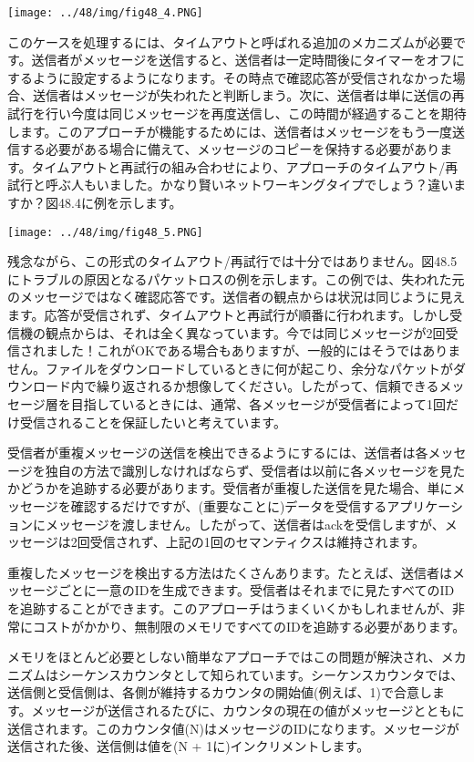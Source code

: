 \texttt{[image: ../48/img/fig48\_4.PNG]}

このケースを処理するには、タイムアウトと呼ばれる追加のメカニズムが必要です。送信者がメッセージを送信すると、送信者は一定時間後にタイマーをオフにするように設定するようになります。その時点で確認応答が受信されなかった場合、送信者はメッセージが失われたと判断しまう。次に、送信者は単に送信の再試行を行い今度は同じメッセージを再度送信し、この時間が経過することを期待します。このアプローチが機能するためには、送信者はメッセージをもう一度送信する必要がある場合に備えて、メッセージのコピーを保持する必要があります。タイムアウトと再試行の組み合わせにより、アプローチのタイムアウト/再試行と呼ぶ人もいました。かなり賢いネットワーキングタイプでしょう？違いますか？図48.4に例を示します。

\texttt{[image: ../48/img/fig48\_5.PNG]}

残念ながら、この形式のタイムアウト/再試行では十分ではありません。図48.5にトラブルの原因となるパケットロスの例を示します。この例では、失われた元のメッセージではなく確認応答です。送信者の観点からは状況は同じように見えます。応答が受信されず、タイムアウトと再試行が順番に行われます。しかし受信機の観点からは、それは全く異なっています。今では同じメッセージが2回受信されました！これがOKである場合もありますが、一般的にはそうではありません。ファイルをダウンロードしているときに何が起こり、余分なパケットがダウンロード内で繰り返されるか想像してください。したがって、信頼できるメッセージ層を目指しているときには、通常、各メッセージが受信者によって1回だけ受信されることを保証したいと考えています。

受信者が重複メッセージの送信を検出できるようにするには、送信者は各メッセージを独自の方法で識別しなければならず、受信者は以前に各メッセージを見たかどうかを追跡する必要があります。受信者が重複した送信を見た場合、単にメッセージを確認するだけですが、(重要なことに)データを受信するアプリケーションにメッセージを渡しません。したがって、送信者はackを受信しますが、メッセージは2回受信されず、上記の1回のセマンティクスは維持されます。

重複したメッセージを検出する方法はたくさんあります。たとえば、送信者はメッセージごとに一意のIDを生成できます。受信者はそれまでに見たすべてのIDを追跡することができます。このアプローチはうまくいくかもしれませんが、非常にコストがかかり、無制限のメモリですべてのIDを追跡する必要があります。

メモリをほとんど必要としない簡単なアプローチではこの問題が解決され、メカニズムはシーケンスカウンタとして知られています。シーケンスカウンタでは、送信側と受信側は、各側が維持するカウンタの開始値(例えば、1)で合意します。メッセージが送信されるたびに、カウンタの現在の値がメッセージとともに送信されます。このカウンタ値(N)はメッセージのIDになります。メッセージが送信された後、送信側は値を(N
+ 1に)インクリメントします。

